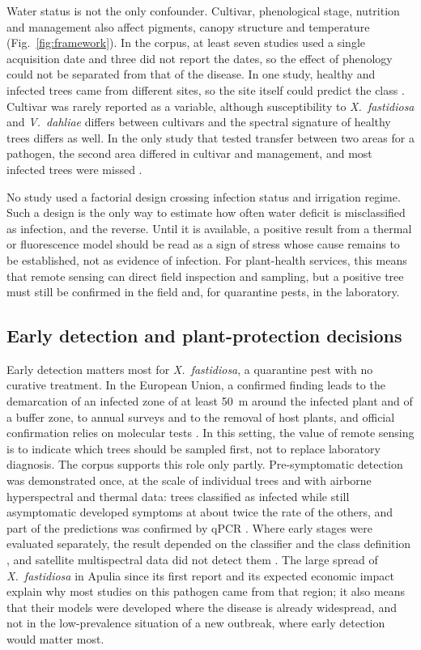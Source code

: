 \documentclass[preprint,12pt]{elsarticle}
\begin{document}
Water status is not the only confounder. Cultivar, phenological stage, nutrition and management also affect pigments, canopy structure and temperature (Fig.~\ref{fig:framework}). In the corpus, at least seven studies used a single acquisition date and three did not report the dates, so the effect of phenology could not be separated from that of the disease. In one study, healthy and infected trees came from different sites, so the site itself could predict the class \citep{u013}. Cultivar was rarely reported as a variable, although susceptibility to \textit{X.~fastidiosa} and \textit{V.~dahliae} differs between cultivars and the spectral signature of healthy trees differs as well. In the only study that tested transfer between two areas for a pathogen, the second area differed in cultivar and management, and most infected trees were missed \citep{u113}.

No study used a factorial design crossing infection status and irrigation regime. Such a design is the only way to estimate how often water deficit is misclassified as infection, and the reverse. Until it is available, a positive result from a thermal or fluorescence model should be read as a sign of stress whose cause remains to be established, not as evidence of infection. For plant-health services, this means that remote sensing can direct field inspection and sampling, but a positive tree must still be confirmed in the field and, for quarantine pests, in the laboratory.

\subsection{Early detection and plant-protection decisions}\label{sec:disc_early}
Early detection matters most for \textit{X.~fastidiosa}, a quarantine pest with no curative treatment. In the European Union, a confirmed finding leads to the demarcation of an infected zone of at least 50~m around the infected plant and of a buffer zone, to annual surveys and to the removal of host plants, and official confirmation relies on molecular tests \citep{eu2020xylella}. In this setting, the value of remote sensing is to indicate which trees should be sampled first, not to replace laboratory diagnosis. The corpus supports this role only partly. Pre-symptomatic detection was demonstrated once, at the scale of individual trees and with airborne hyperspectral and thermal data: trees classified as infected while still asymptomatic developed symptoms at about twice the rate of the others, and part of the predictions was confirmed by qPCR \citep{u008}. Where early stages were evaluated separately, the result depended on the classifier and the class definition \citep{u002,u036}, and satellite multispectral data did not detect them \citep{u056}. The large spread of \textit{X.~fastidiosa} in Apulia since its first report \citep{Saponari2013Identification} and its expected economic impact \citep{Schneider2020Impact} explain why most studies on this pathogen came from that region; it also means that their models were developed where the disease is already widespread, and not in the low-prevalence situation of a new outbreak, where early detection would matter most.
\end{document}
